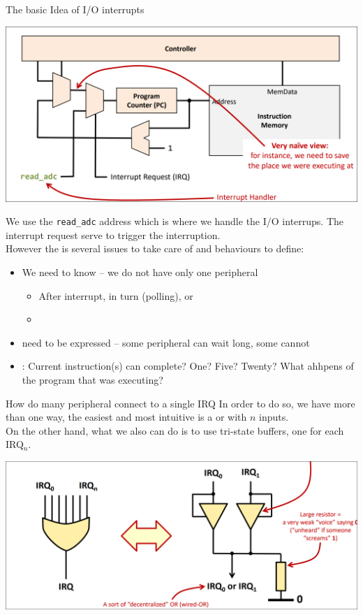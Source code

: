 \begin{parag}{The basic Idea of I/O interrupts}
    \begin{center}
    \includegraphics[scale=0.3]{screenshots/2025-10-22_12.png}
    \end{center}
	We use the \texttt{read\_adc} address which is where we handle the I/O interrups. The interrupt request serve to trigger the interruption.\\
	However the is several issues to take care of and behaviours to define:
	\begin{itemize}
	    \item We need to know  -- we do not have only one peripheral
			\begin{itemize}
				\item After interrupt,  in turn (polling), or 
				\item {}
			\end{itemize}
		\item {} need to be expressed -- some peripheral can wait long, some cannot
		\item {}: Current instruction(s) can complete? One? Five? Twenty? What ahhpens of the program that was executing?
	\end{itemize}
	\begin{subparag}{How do many peripheral connect to a single IRQ}
	    In order to do so, we have more than one way, the easiest and most intuitive is a or with $n$ inputs.\\
		On the other hand, what we also can do is to use tri-state buffers, one for each IRQ$_n$.
	\end{subparag}
	\begin{center}
	\includegraphics[scale=0.2]{screenshots/2025-10-22_13.png}

\end{center}
\end{parag}
